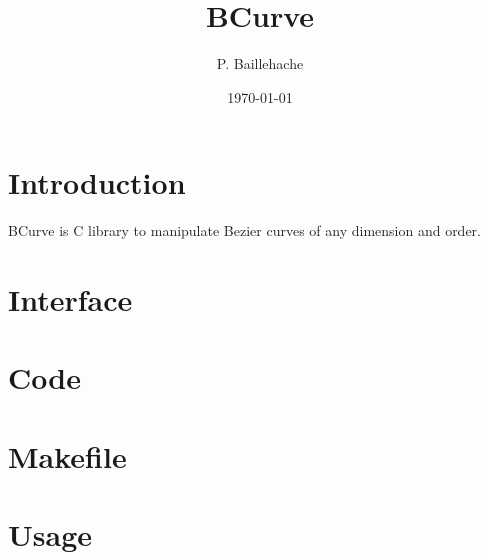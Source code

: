 \documentclass[12pt, a4paper]{article}
\begin{document}
\title{BCurve}
\author{P. Baillehache}
\date{\today}
\maketitle

\tableofcontents

\section*{Introduction}

BCurve is C library to manipulate Bezier curves of any dimension and order.\\ 

\section{Interface}

\begin{scriptsize}
\begin{ttfamily}

\end{ttfamily}
\end{scriptsize}

\section{Code}

\begin{scriptsize}
\begin{ttfamily}

\end{ttfamily}
\end{scriptsize}

\section{Makefile}

\begin{scriptsize}
\begin{ttfamily}

\end{ttfamily}
\end{scriptsize}

\section{Usage}

\begin{scriptsize}
\begin{ttfamily}

\end{ttfamily}
\end{scriptsize}
\end{document}
